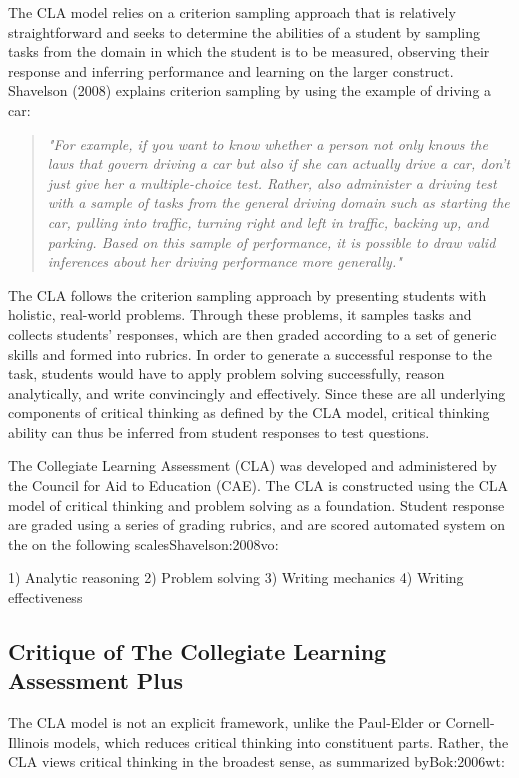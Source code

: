 The CLA model relies on a criterion sampling approach that is relatively straightforward and seeks to determine the abilities of a student by sampling tasks from the domain in which the student is to be measured, observing their response and inferring performance and learning on the larger construct. Shavelson (2008) explains criterion sampling by using the example of driving a car:

\begin{quote}
\textit{"For example, if you want to know whether a person not only knows the laws that govern driving a car but also if she can actually drive a car, don’t just give her a multiple-choice test. Rather, also administer a driving test with a sample of tasks from the general driving domain such as starting the car, pulling into traffic, turning right and left in traffic, backing up, and parking. Based on this sample of performance, it is possible to draw valid inferences about her driving performance more generally." }
\end{quote}

The CLA follows the criterion sampling approach by presenting students with holistic, real-world problems. Through these problems, it samples tasks and collects students’ responses, which are then graded according to a set of generic skills and formed into rubrics. In order to generate a successful response to the task, students would have to apply problem solving successfully, reason analytically, and write convincingly and effectively. Since these are all underlying components of critical thinking as defined by the CLA model, critical thinking ability can thus be inferred from student responses to test questions.

The Collegiate Learning Assessment (CLA) was developed and administered by the Council for Aid to Education (CAE).  The CLA is constructed using the CLA model of critical thinking and problem solving as a foundation. Student response are graded using a series of grading rubrics, and are scored automated system on the on the following scales{Shavelson:2008vo}:

1)	Analytic reasoning
2)	Problem solving
3)	Writing mechanics
4)	Writing effectiveness

\subsection{Critique of The Collegiate Learning Assessment Plus}


The CLA model is not an explicit framework, unlike the Paul-Elder or Cornell-Illinois models, which reduces critical thinking into constituent parts. Rather, the CLA views critical thinking in the broadest sense, as summarized by{Bok:2006wt}:

